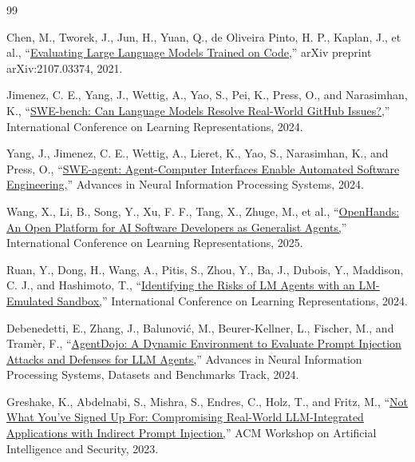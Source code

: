 \documentclass[12pt,a4paper,oneside]{report}
\begin{document}
\begingroup
\renewcommand{\bibname}{Bibliography}
\begin{thebibliography}{99}
 Chen, M., Tworek, J., Jun, H., Yuan, Q., de Oliveira Pinto, H. P., Kaplan, J., et al., ``\href{https://arxiv.org/abs/2107.03374}{Evaluating Large Language Models Trained on Code,}'' arXiv preprint arXiv:2107.03374, 2021.

 Jimenez, C. E., Yang, J., Wettig, A., Yao, S., Pei, K., Press, O., and Narasimhan, K., ``\href{https://openreview.net/forum?id=VTF8yNQM66}{SWE-bench: Can Language Models Resolve Real-World GitHub Issues?,}'' International Conference on Learning Representations, 2024.

 Yang, J., Jimenez, C. E., Wettig, A., Lieret, K., Yao, S., Narasimhan, K., and Press, O., ``\href{https://proceedings.neurips.cc/paper_files/paper/2024/hash/5a7c947568c1b1328ccc5230172e1e7c-Abstract-Conference.html}{SWE-agent: Agent-Computer Interfaces Enable Automated Software Engineering,}'' Advances in Neural Information Processing Systems, 2024.

 Wang, X., Li, B., Song, Y., Xu, F. F., Tang, X., Zhuge, M., et al., ``\href{https://arxiv.org/abs/2407.16741}{OpenHands: An Open Platform for AI Software Developers as Generalist Agents,}'' International Conference on Learning Representations, 2025.

 Ruan, Y., Dong, H., Wang, A., Pitis, S., Zhou, Y., Ba, J., Dubois, Y., Maddison, C. J., and Hashimoto, T., ``\href{https://openreview.net/forum?id=GEcwtMk1uA}{Identifying the Risks of LM Agents with an LM-Emulated Sandbox,}'' International Conference on Learning Representations, 2024.

 Debenedetti, E., Zhang, J., Balunović, M., Beurer-Kellner, L., Fischer, M., and Tramèr, F., ``\href{https://proceedings.neurips.cc/paper_files/paper/2024/file/97091a5177d8dc64b1da8bf3e1f6fb54-Paper-Datasets_and_Benchmarks_Track.pdf}{AgentDojo: A Dynamic Environment to Evaluate Prompt Injection Attacks and Defenses for LLM Agents,}'' Advances in Neural Information Processing Systems, Datasets and Benchmarks Track, 2024.

 Greshake, K., Abdelnabi, S., Mishra, S., Endres, C., Holz, T., and Fritz, M., ``\href{https://doi.org/10.1145/3605764.3623985}{Not What You've Signed Up For: Compromising Real-World LLM-Integrated Applications with Indirect Prompt Injection,}'' ACM Workshop on Artificial Intelligence and Security, 2023.


\end{thebibliography}
\end{document}
